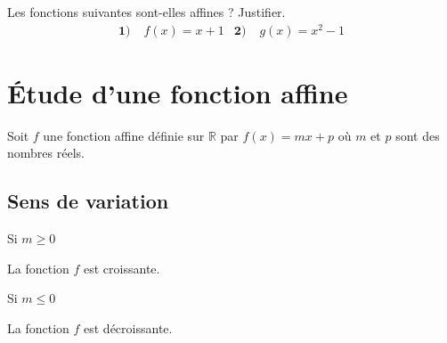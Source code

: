 \documentclass[11pt]{article}
\begin{document}
\begin{app}
  Les fonctions suivantes sont-elles affines ? Justifier.
  \begin{align*}
    \textbf{1)}\;& f(x) = x+1 &
    \textbf{2)}\;& g(x) = x^2 - 1
  \end{align*}
\end{app}



\section{Étude d'une fonction affine}

Soit $f$ une fonction affine définie sur $\mathbb{R}$ par $f(x)=mx+p$ où $m$ et
$p$ sont des nombres réels.


\subsection{Sens de variation}
\begin{prop}
  \begin{minipage}[]{.5\textwidth}
    \begin{center}
      {\LARGE Si $m\geq0$}
    \end{center}
      La fonction $f$ est croissante.
    \begin{center}
    \end{center}
  \end{minipage}
  \begin{minipage}[]{.5\textwidth}
    \begin{center}
      {\LARGE Si $m\leq0$}
    \end{center}
      La fonction $f$ est décroissante.
    \begin{center}
    \end{center}

  \end{minipage}
\end{prop}
\end{document}
